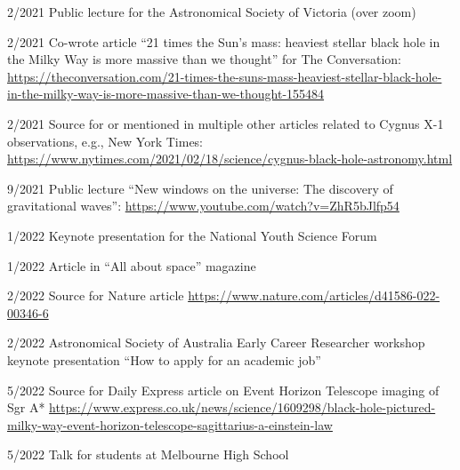\documentclass[margin,line]{res}
\begin{document}
\begin{resume}
2/2021 	Public lecture for the Astronomical Society of Victoria (over zoom)

2/2021 	Co-wrote article ``21 times the Sun's mass: heaviest stellar black hole in the Milky Way is more massive than we thought'' for The Conversation: \url{https://theconversation.com/21-times-the-suns-mass-heaviest-stellar-black-hole-in-the-milky-way-is-more-massive-than-we-thought-155484}

2/2021	Source for or mentioned in multiple other articles related to Cygnus X-1 observations, e.g., New York Times: \url{https://www.nytimes.com/2021/02/18/science/cygnus-black-hole-astronomy.html}
	  
9/2021	Public lecture ``New windows on the universe: The discovery of gravitational waves'': \url{https://www.youtube.com/watch?v=ZhR5bJlfp54}

1/2022	Keynote presentation for the National Youth Science Forum

1/2022	Article in ``All about space'' magazine
	  
2/2022  	Source for Nature article \url{https://www.nature.com/articles/d41586-022-00346-6}

2/2022	Astronomical Society of Australia Early Career Researcher workshop keynote presentation ``How to apply for an academic job'' 

5/2022	Source for Daily Express article on Event Horizon Telescope imaging of Sgr A* \url{https://www.express.co.uk/news/science/1609298/black-hole-pictured-milky-way-event-horizon-telescope-sagittarius-a-einstein-law}

5/2022	Talk for students at Melbourne High School
	  
\end{resume}
\end{document}
